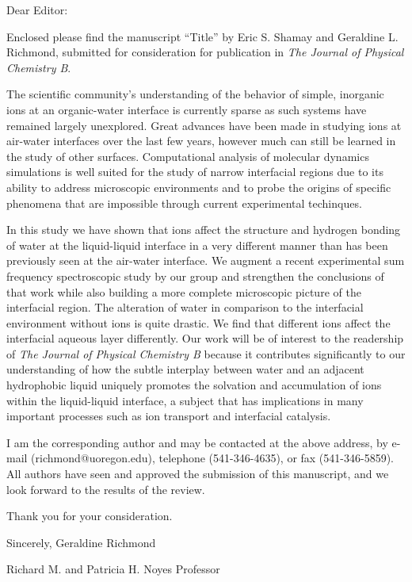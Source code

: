 Dear Editor:

Enclosed please find the manuscript ``Title'' by Eric S. Shamay and Geraldine L. Richmond, submitted for consideration for publication in \textit{The Journal of Physical Chemistry B}.

The scientific community's understanding of the behavior of simple, inorganic ions at an organic-water interface is currently sparse as such systems have remained largely unexplored. Great advances have been made in studying ions at air-water interfaces over the last few years, however much can still be learned in the study of other surfaces. Computational analysis of molecular dynamics simulations is well suited for the study of narrow interfacial regions due to its ability to address microscopic environments and to probe the origins of specific phenomena that are impossible through current experimental techinques.

In this study we have shown that ions affect the structure and hydrogen bonding of water at the liquid-liquid interface in a very different manner than has been previously seen at the air-water interface. We augment a recent experimental sum frequency spectroscopic study by our group and strengthen the conclusions of that work while also building a more complete microscopic picture of the interfacial region. The alteration of water in comparison to the interfacial environment without ions is quite drastic. We find that different ions affect the interfacial aqueous layer differently. Our work will be of interest to the readership of \textit{The Journal of Physical Chemistry B} because it contributes significantly to our understanding of how the subtle interplay between water and an adjacent hydrophobic liquid uniquely promotes the solvation and accumulation of ions within the liquid-liquid interface, a subject that has implications in many important processes such as ion transport and interfacial catalysis.

I am the corresponding author and may be contacted at the above address, by e-mail (richmond@uoregon.edu), telephone (541-346-4635), or fax (541-346-5859).  All authors have seen and approved the submission of this manuscript, and we look forward to the results of the review.

 

Thank you for your consideration.

 

Sincerely,  
Geraldine Richmond

Richard M. and Patricia H. Noyes Professor

